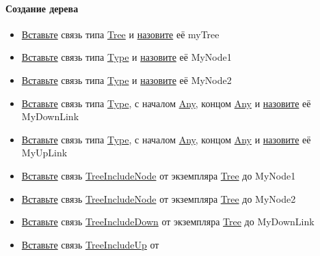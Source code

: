 \documentclass{article}
\begin{document}
\paragraph{Создание дерева}
\begin{itemize}
      \item \hyperlink{DeepCase.InsertLink.Description}{Вставьте} связь типа
            \hyperlink{Tree}{Tree} и \hyperlink{FAQ.HowToSetName}{назовите} её
            myTree
      \item \hyperlink{DeepCase.InsertLink.Description}{Вставьте} связь типа
            \hyperlink{Type.Description}{Type} и
            \hyperlink{FAQ.HowToSetName}{назовите} её MyNode1
      \item \hyperlink{DeepCase.InsertLink.Description}{Вставьте} связь типа
            \hyperlink{Type.Description}{Type} и
            \hyperlink{FAQ.HowToSetName}{назовите} её MyNode2
      \item \hyperlink{DeepCase.InsertLink.Description}{Вставьте} связь типа
            \hyperlink{Type.Description}{Type}, с началом
            \hyperlink{Core.Any.Description}{Any}, концом
            \hyperlink{Core.Any.Description}{Any} и
            \hyperlink{FAQ.HowToSetName}{назовите} её
            MyDownLink
      \item \hyperlink{DeepCase.InsertLink.Description}{Вставьте} связь типа
            \hyperlink{Type.Description}{Type}, с началом
            \hyperlink{Core.Any.Description}{Any}, концом
            \hyperlink{Core.Any.Description}{Any} и
            \hyperlink{FAQ.HowToSetName}{назовите} её
            MyUpLink
      \item \hyperlink{DeepCase.InsertLink.Description}{Вставьте} связь
            \hyperlink{Core.TreeIncludeNode.Description}{TreeIncludeNode} от
            экземпляра \hyperlink{Core.Tree.Description}{Tree} до MyNode1
      \item \hyperlink{DeepCase.InsertLink.Description}{Вставьте} связь
            \hyperlink{Core.TreeIncludeNode.Description}{TreeIncludeNode} от
            экземпляра \hyperlink{Core.Tree.Description}{Tree} до MyNode2
      \item \hyperlink{DeepCase.InsertLink.Description}{Вставьте} связь
            \hyperlink{Core.TreeIncludeDown.Description}{TreeIncludeDown} от
            экземпляра \hyperlink{Core.Tree.Description}{Tree} до MyDownLink
      \item \hyperlink{DeepCase.InsertLink.Description}{Вставьте} связь
            \hyperlink{Core.TreeIncludeNode.Description}{TreeIncludeUp} от

\end{itemize}
\end{document}
